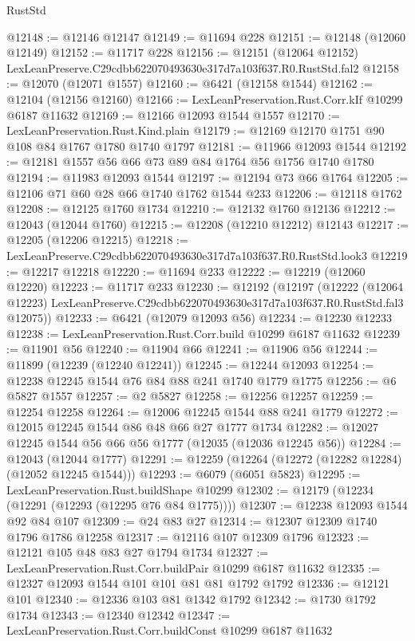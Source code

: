 \begin{lexlean}{RustStd}
\begin{coremodule}
@12148 := @12146 @12147
@12149 := @11694 @228
@12151 := @12148 (@12060 @12149)
@12152 := @11717 @228
@12156 := @12151 (@12064 @12152) LexLeanPreserve.C29cdbb622070493630e317d7a103f637.R0.RustStd.fal2
@12158 := @12070 (@12071 @1557)
@12160 := @6421 (@12158 @1544)
@12162 := @12104 (@12156 @12160)
@12166 := LexLeanPreservation.Rust.Corr.kIf @10299 @6187 @11632
@12169 := @12166 @12093 @1544 @1557
@12170 := LexLeanPreservation.Rust.Kind.plain
@12179 := @12169 @12170 @1751 @90 @108 @84 @1767 @1780 @1740 @1797
@12181 := @11966 @12093 @1544
@12192 := @12181 @1557 @56 @66 @73 @89 @84 @1764 @56 @1756 @1740 @1780
@12194 := @11983 @12093 @1544
@12197 := @12194 @73 @66 @1764
@12205 := @12106 @71 @60 @28 @66 @1740 @1762 @1544 @233
@12206 := @12118 @1762
@12208 := @12125 @1760 @1734
@12210 := @12132 @1760 @12136
@12212 := @12043 (@12044 @1760)
@12215 := @12208 (@12210 @12212) @12143
@12217 := @12205 (@12206 @12215)
@12218 := LexLeanPreserve.C29cdbb622070493630e317d7a103f637.R0.RustStd.look3
@12219 := @12217 @12218
@12220 := @11694 @233
@12222 := @12219 (@12060 @12220)
@12223 := @11717 @233
@12230 := @12192
    (@12197
      (@12222
        (@12064 @12223)
        LexLeanPreserve.C29cdbb622070493630e317d7a103f637.R0.RustStd.fal3
        @12075))
@12233 := @6421 (@12079 @12093 @56)
@12234 := @12230 @12233
@12238 := LexLeanPreservation.Rust.Corr.build @10299 @6187 @11632
@12239 := @11901 @56
@12240 := @11904 @66
@12241 := @11906 @56
@12244 := @11899 (@12239 (@12240 @12241))
@12245 := @12244 @12093
@12254 := @12238 @12245 @1544 @76 @84 @88 @241 @1740 @1779 @1775
@12256 := @6 @5827 @1557
@12257 := @2 @5827
@12258 := @12256 @12257
@12259 := @12254 @12258
@12264 := @12006 @12245 @1544 @88 @241 @1779
@12272 := @12015 @12245 @1544 @86 @48 @66 @27 @1777 @1734
@12282 := @12027 @12245 @1544 @56 @66 @56 @1777 (@12035 (@12036 @12245 @56))
@12284 := @12043 (@12044 @1777)
@12291 := @12259 (@12264 (@12272 (@12282 @12284) (@12052 @12245 @1544)))
@12293 := @6079 (@6051 @5823)
@12295 := LexLeanPreservation.Rust.buildShape @10299
@12302 := @12179 (@12234 (@12291 (@12293 (@12295 @76 @84 @1775))))
@12307 := @12238 @12093 @1544 @92 @84 @107
@12309 := @24 @83 @27
@12314 := @12307 @12309 @1740 @1796 @1786 @12258
@12317 := @12116 @107 @12309 @1796
@12323 := @12121 @105 @48 @83 @27 @1794 @1734
@12327 := LexLeanPreservation.Rust.Corr.buildPair @10299 @6187 @11632
@12335 := @12327 @12093 @1544 @101 @101 @81 @81 @1792 @1792
@12336 := @12121 @101
@12340 := @12336 @103 @81 @1342 @1792
@12342 := @1730 @1792 @1734
@12343 := @12340 @12342
@12347 := LexLeanPreservation.Rust.Corr.buildConst @10299 @6187 @11632

\end{coremodule}
\end{lexlean}
